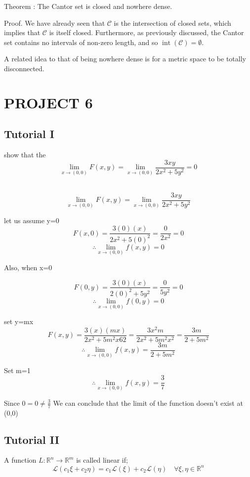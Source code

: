 \documentclass{article}
\begin{document}
\begin{itemize}
Theorem : The Cantor set is closed and nowhere dense.

Proof. We have already seen that $\mathcal{C}$ is the intersection of closed sets, which implies that $\mathcal{C}$ is itself closed. Furthermore, as previously discussed, the Cantor set contains no intervals of non-zero length, and so $\operatorname{int}(\mathcal{C})=\emptyset$.

A related idea to that of being nowhere dense is for a metric space to be totally disconnected.
\end{itemize}

\section{PROJECT 6}

\subsection{Tutorial I}
show that the 
$$\lim_{x \to(0,0)}F(x,y) = \lim_{x \to(0,0)} \frac{3xy}{2x^2+5y^2}=0$$

\\

\Large
$$\lim_{x \to(0,0)}F(x,y) = \lim_{x \to(0,0)} \frac{3xy}{2x^2+5y^2}$$

let us assume y=0
$$F(x,0) = \frac{3(0)(x)}{2x^2+5(0)^2} =\frac{0}{2x^2}=0$$
$$\therefore \lim_{x \to(0,0)} f(x,y) =0$$

Also, when x=0

$$F(0,y) = \frac{3(0)(x)}{2(0)^2+5y^2} =\frac{0}{5y^2}=0$$
$$\therefore \lim_{x \to(0,0)} f(0,y) =0$$

set y=mx
$$F(x,y) = \frac{3(x)(mx)}{2x^2+5m^2x62} =\frac{3x^2m}{2x^2+5m^2x^2}=\frac{3m}{2+5m^2}$$
$$\therefore \lim_{x \to(0,0)} f(x,y) =\frac{3m}{2+5m^2}$$

Set m=1
$$\therefore \lim_{x \to(0,0)} f(x,y) =\frac{3}{7}$$

Since $0=0 \neq \frac{3}{7}$
We can conclude that the limit of the function doesn't exist at (0,0)

\subsection{Tutorial II}

A function $L: \mathbb{R}^{n} \rightarrow \mathbb{R}^{m}$ is called linear if;
$$
\mathcal{L}\left(c_{1} \xi+c_{2} \eta\right)=c_{1} \mathcal{L}(\xi)+c_{2} \mathcal{L}(\eta) \quad \forall \xi, \eta \in \mathbb{R}^{n}
$$
\end{document}
